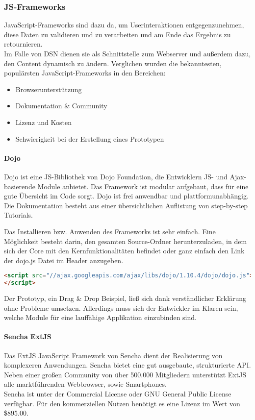 \subsubsection{JS-Frameworks}
JavaScript-Frameworks sind dazu da, um Userinteraktionen entgegenzunehmen, diese Daten zu validieren und zu verarbeiten und am Ende das Ergebnis zu retournieren.\\
Im Falle von DSN dienen sie als Schnittstelle zum Webserver und außerdem dazu, den Content dynamisch zu ändern. Verglichen wurden die bekanntesten, populärsten JavaScript-Frameworks in den Bereichen:
\begin{itemize}
\item Browserunterstützung
\item Dokumentation \& Community
\item Lizenz und Kosten
\item Schwierigkeit bei der Erstellung eines Prototypen
\end{itemize}
\paragraph{Dojo}
Dojo ist eine JS-Bibliothek von Dojo Foundation, die Entwicklern JS- und Ajax-basierende Module anbietet. Das Framework ist modular aufgebaut, dass für eine gute Übersicht im Code sorgt. Dojo ist frei anwendbar und plattformunabhängig. Die Dokumentation besteht aus einer übersichtlichen Auflistung von step-by-step Tutorials. \cite{DOJO}

Das Installieren bzw. Anwenden des Frameworks ist sehr einfach. Eine Möglichkeit besteht darin, den gesamten Source-Ordner herunterzuladen, in dem sich der Core mit den Kernfunktionalitäten befindet oder ganz einfach den Link der dojo.js Datei im Header anzugeben.
\begin{lstlisting}[caption={Dojo einbinden\cite{DOJODOWN}}, language=HTML]
<script src="//ajax.googleapis.com/ajax/libs/dojo/1.10.4/dojo/dojo.js">
</script>
\end{lstlisting}

Der Prototyp, ein Drag \& Drop Beispiel, ließ sich dank verständlicher Erklärung ohne Probleme umsetzen. Allerdings muss sich der Entwickler im Klaren sein, welche Module für eine lauffähige Applikation einzubinden sind. \cite{DOJOINFO}

\paragraph{Sencha ExtJS}
Das ExtJS JavaScript Framework von Sencha dient der Realisierung von komplexeren Anwendungen. Sencha bietet eine gut ausgebaute, strukturierte API. Neben einer großen Community von über 500.000 Mitgliedern unterstützt ExtJS alle marktführenden Webbrowser, sowie Smartphones.\\
Sencha ist unter der Commercial License oder GNU General Public License verfügbar. Für den kommerziellen Nutzen benötigt es eine Lizenz im Wert von \$895.00.\cite{SENCHA}

